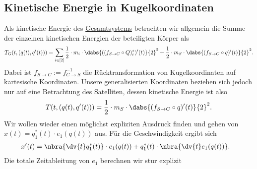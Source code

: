 \documentclass{subfiles}
\begin{document}
    \subsection*{Kinetische Energie in Kugelkoordinaten}
        Als kinetische Energie des \underline{Gesamtsystems} betrachten wir allgemein die Summe der einzelnen kinetischen Energien der beteiligten Körper als
        \[
            T_G(t,(q(t),q'(t))) = \sum_{i\in[2]}\frac12\cdot m_i\cdot\dabs{((f_{S\to C}\circ Q)_i^*)'(t)}{2}^2 + \frac12\cdot m_S\cdot\dabs{(f_{S\to C}\circ q)'(t)}{2}^2.
        \]
        Dabei ist $f_{S\to C}:= f_{C\to S}^{-1}$ die Rücktransformation von Kugelkoordinaten auf kartesische Koordinaten. Unsere generalisierten Koordinaten beziehen sich jedoch nur auf eine Betrachtung des Satelliten, dessen kinetische Energie ist also
        \[
            T(t,(q(t),q'(t))) = \frac12\cdot m_S\cdot\dabs{(f_{S\to C}\circ q)'(t)}{2}^2.
        \] 
        Wir wollen wieder einen möglichst expliziten Ausdruck finden und gehen von $x(t)=q_1^*(t)\cdot e_1(q(t))$ aus. Für die Geschwindigkeit ergibt sich 
        \begin{align*}
            x'(t) &= \nbra{\dv{t} q_1^*(t)}\cdot e_1(q(t)) + q_1^*(t)\cdot\nbra{\dv{t} e_1(q(t))}.
        \end{align*}
        Die totale Zeitableitung von $e_1$ berechnen wir stur explizit
\end{document}
